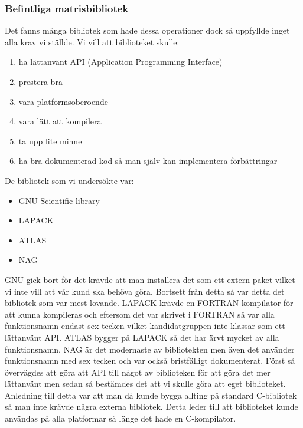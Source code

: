 \subsubsection{Befintliga matrisbibliotek}
Det fanns många bibliotek som hade dessa operationer dock så uppfyllde inget alla krav vi ställde. Vi vill att biblioteket skulle:
\begin{enumerate}
\item ha lättanvänt API (Application Programming Interface)
\item prestera bra
\item vara platformsoberoende
\item vara lätt att kompilera
\item ta upp lite minne
\item ha bra dokumenterad kod så man själv kan implementera förbättringar
\end{enumerate} 
De bibliotek som vi undersökte var:
\begin{itemize}

\item GNU Scientific library
\item LAPACK
\item ATLAS
\item NAG

\end{itemize}
GNU gick bort för det krävde att man installera det som ett extern paket vilket vi inte vill att vår kund ska behöva göra. Bortsett från detta så var detta det bibliotek som var mest lovande. 
LAPACK krävde en FORTRAN kompilator för att kunna kompileras och eftersom det var skrivet i FORTRAN så var alla funktionsnamn endast sex tecken vilket kandidatgruppen inte klassar som ett lättanvänt API.
ATLAS bygger på LAPACK så det har ärvt mycket av alla funktionsnamn.
NAG är det modernaste av bibliotekten men även det använder funktionsnamn med sex tecken och var också bristfälligt dokumenterat.
\newline
\newline
Först så övervägdes att göra att API till något av biblioteken för att göra det mer lättanvänt men sedan så bestämdes det att vi skulle göra att eget biblioteket. Anledning till detta var att man då kunde bygga allting på standard C-bibliotek så man inte krävde några externa bibliotek. Detta leder till att biblioteket kunde användas på alla platformar så länge det hade en C-kompilator. 


